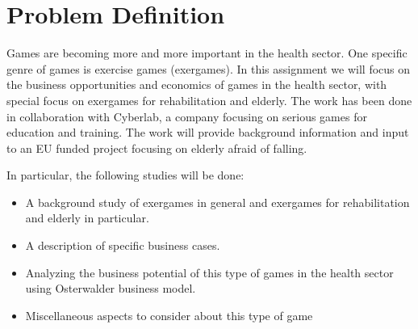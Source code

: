 \documentclass[b5paper,twoside,openright,11pt]{report}
\begin{document}
\section{Problem Definition}
Games are becoming more and more important in the health sector. One specific genre of games is exercise games (exergames). In this assignment we will focus on the business opportunities and economics of games in the health sector, with special focus on exergames for rehabilitation and elderly. The work has been done in collaboration with Cyberlab, a company focusing on serious games for education and training. The work will provide background information and input to an EU funded project focusing on elderly afraid of falling.

In particular, the following studies will be done: 
\begin{itemize}
\renewcommand{\labelitemi}{$\bullet$}
\item A background study of exergames in general and exergames for rehabilitation and elderly in particular.
\item	A description of specific business cases.
\item	Analyzing the business potential of this type of games in the health sector using Osterwalder business model.
\item	Miscellaneous aspects to consider about this type of game
\end{itemize}

\cleardoublepage
\tableofcontents
\cleardoublepage
\listoffigures
\cleardoublepage
\listoftables
\cleardoublepage
{}

\cleardoublepage

\cleardoublepage

\cleardoublepage

\cleardoublepage

\cleardoublepage

\cleardoublepage

\cleardoublepage

\cleardoublepage


\cleardoublepage


\cleardoublepage

\end{document}
